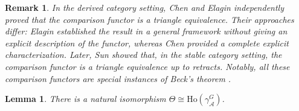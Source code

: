 \documentclass[12pt,twoside]{amsart}
\theoremstyle{bfupright head,slanted body}
\theoremstyle{bfupright head,upright body}
\theoremstyle{fixed bf head,slanted body}
\newtheorem{lem}[res]{Lemma}            \newtheorem*{lem*}{Lemma}
\theoremstyle{fixed bf head,upright body}
\newtheorem{rmk}[res]{Remark}           \newtheorem*{rmk*}{Remark}
\theoremstyle{numbered paragraph}
\newcommand{\thmcite}[2][?]{\cite[Theorem~#1]{#2}}
\numberwithin{equation}{res}
\newcommand{\calA}{\mathcal{A}}
\newcommand{\Ho}{\mathrm{Ho}}
\begin{document}
\begin{rmk}
In the derived category setting, Chen \cite[Proposition 4.5]{2015Chen} and Elagin \thmcite[7.1]{2014Elag} independently proved that the comparison functor is a triangle equivalence.
Their approaches differ: Elagin established the result in a general framework without giving an explicit description of the functor, whereas Chen provided a complete explicit characterization.
Later, Sun \thmcite[3.14]{2019Sun} showed that, in the stable category setting, the comparison functor is a triangle equivalence up to retracts.
Notably, all these comparison functors are special instances of Beck's theorem \cite[Chapter VI 7.1]{1998Mac}.
\end{rmk}

\begin{lem} \label{Ho iso theta}
There is a natural isomorphism \(\Theta \cong \Ho(\gamma_{\calA}^G)\).
\end{lem}
\end{document}
